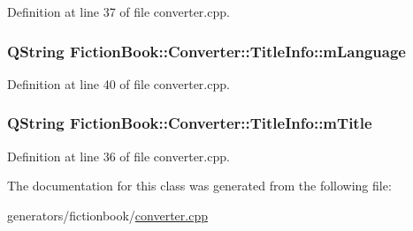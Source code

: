 Definition at line 37 of file converter.\+cpp.

\hypertarget{classConverter_1_1TitleInfo_a92f85102e5c0766f86f1963a3bb35c84}{
\subsubsection[{m\+Language}]{\setlength{\rightskip}{0pt plus 5cm}Q\+String Fiction\+Book\+::\+Converter\+::\+Title\+Info\+::m\+Language}}\label{classConverter_1_1TitleInfo_a92f85102e5c0766f86f1963a3bb35c84}


Definition at line 40 of file converter.\+cpp.

\hypertarget{classConverter_1_1TitleInfo_a19645faf3d93e1588645fa6d50daa69a}{
\subsubsection[{m\+Title}]{\setlength{\rightskip}{0pt plus 5cm}Q\+String Fiction\+Book\+::\+Converter\+::\+Title\+Info\+::m\+Title}}\label{classConverter_1_1TitleInfo_a19645faf3d93e1588645fa6d50daa69a}


Definition at line 36 of file converter.\+cpp.



The documentation for this class was generated from the following file\+:\begin{DoxyCompactItemize}
\item 
generators/fictionbook/\hyperlink{fictionbook_2converter_8cpp}{converter.\+cpp}\end{DoxyCompactItemize}
